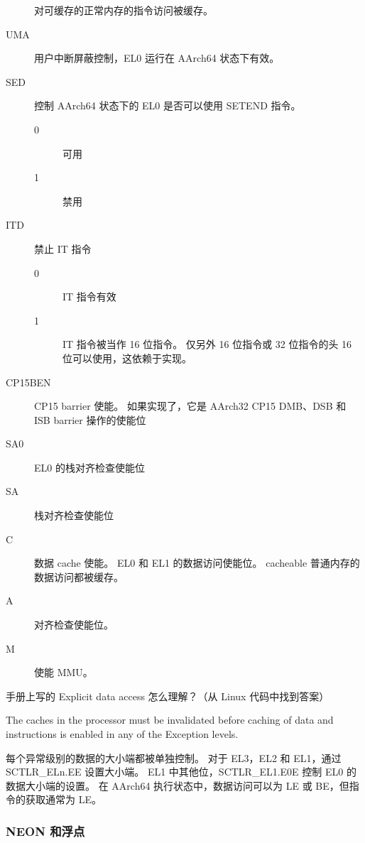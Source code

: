 \begin{description}
    对可缓存的正常内存的指令访问被缓存。
  \item[UMA] 用户中断屏蔽控制，EL0 运行在 AArch64 状态下有效。
  \item[SED] 控制 AArch64 状态下的 EL0 是否可以使用 SETEND 指令。
    \begin{description}
      \item[0] 可用
      \item[1] 禁用
    \end{description}
  \item[ITD] 禁止 IT 指令
    \begin{description}
      \item[0] IT 指令有效
      \item[1] IT 指令被当作 16 位指令。
        仅另外 16 位指令或 32 位指令的头 16 位可以使用，这依赖于实现。
    \end{description}
  \item[CP15BEN] CP15 barrier 使能。
    如果实现了，它是 AArch32 CP15 DMB、DSB 和 ISB barrier 操作的使能位
  \item[SA0] EL0 的栈对齐检查使能位
  \item[SA] 栈对齐检查使能位
  \item[C] 数据 cache 使能。
    EL0 和 EL1 的数据访问使能位。
    cacheable 普通内存的数据访问都被缓存。
  \item[A] 对齐检查使能位。
  \item[M] 使能 MMU。
\end{description}

\begin{probsolu}[title={Problem and Solution \theprob}]{
    手册上写的 Explicit data access 怎么理解？（从 Linux 代码中找到答案）}

\end{probsolu}

\begin{remark}
  The caches in the processor must be invalidated before caching of data and instructions is
enabled in any of the Exception levels.
\end{remark}

每个异常级别的数据的大小端都被单独控制。
对于 EL3，EL2 和 EL1，通过 SCTLR\_ELn.EE 设置大小端。
EL1 中其他位，SCTLR\_EL1.E0E 控制 EL0 的数据大小端的设置。
在 AArch64 执行状态中，数据访问可以为 LE 或 BE，但指令的获取通常为 LE。

\subsubsection{NEON 和浮点}

